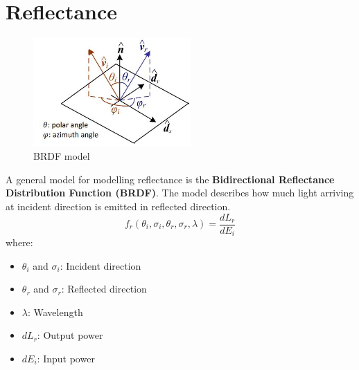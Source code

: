 \documentclass{report}
\begin{document}
\section{Reflectance}

\begin{figure}
\centering
\includegraphics[width=6cm]{BRDF.JPG}
\caption{BRDF model}
\label{fig:myfig}
\end{figure}

A general model for modelling reflectance is the
\textbf{Bidirectional Reflectance Distribution Function (BRDF)}. The model
describes how much light arriving at incident direction is emitted in
reflected direction. 
$$
f_r\left(\theta_i, \sigma_i, \theta_r, \sigma_r, \lambda\right) = \frac{dL_r}{dE_i}
$$
where:
\begin{itemize}
    \item $\theta_i$ and $\sigma_i$: Incident direction
    \item $\theta_r$ and $\sigma_r$: Reflected direction
    \item $\lambda$: Wavelength
    \item $dL_r$: Output power 
    \item $dE_i$: Input power 
\end{itemize}

\pagebreak
\end{document}
